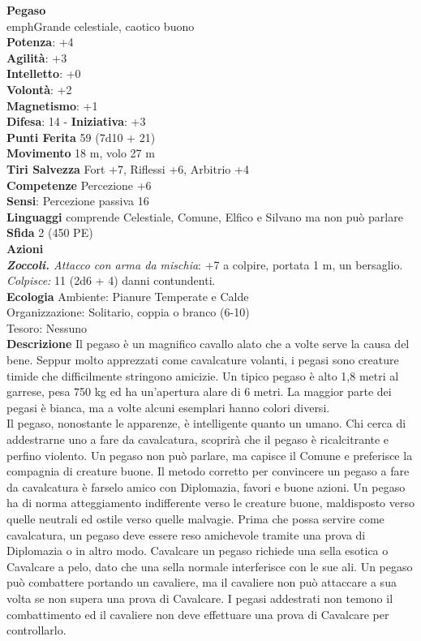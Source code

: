\begin{multicols}{2}
\medskip\textbf{Pegaso}\\
emph{Grande celestiale, caotico buono}\\
\textbf{Potenza}: +4\\
\textbf{Agilità}: +3\\
\textbf{Intelletto}: +0\\
\textbf{Volontà}: +2\\
\textbf{Magnetismo}: +1\\
\textbf{Difesa}: 14 - \textbf{Iniziativa}: +3\\
\textbf{Punti Ferita} 59 (7d10 + 21)\\
\textbf{Movimento} 18 m, volo 27 m\\
\textbf{Tiri Salvezza} Fort +7, Riflessi +6, Arbitrio +4\\
\textbf{Competenze} Percezione +6\\
\textbf{Sensi}: Percezione passiva 16\\
\textbf{Linguaggi} comprende Celestiale, Comune, Elfico e Silvano ma non può parlare\\
\textbf{Sfida} 2 (450 PE)\smallskip\\
\smallskip\textbf{Azioni}\\
\emph{\textbf{Zoccoli.} Attacco con arma da mischia}: +7 a colpire, portata 1 m, un bersaglio.\\
\emph{Colpisce:} 11 (2d6 + 4) danni contundenti.\\
\textbf{Ecologia}
Ambiente: Pianure Temperate e Calde\\
Organizzazione: Solitario, coppia o branco (6-10)\\
Tesoro: Nessuno\\
\textbf{Descrizione}
Il pegaso è un magnifico cavallo alato che a volte serve la causa del bene. Seppur molto apprezzati come cavalcature volanti, i pegasi sono creature timide che difficilmente stringono amicizie. Un tipico pegaso è alto 1,8 metri al garrese, pesa 750 kg ed ha un’apertura alare di 6 metri. La maggior parte dei pegasi è bianca, ma a volte alcuni esemplari hanno colori diversi.\\

Il pegaso, nonostante le apparenze, è intelligente quanto un umano. Chi cerca di addestrarne uno a fare da cavalcatura, scoprirà che il pegaso è ricalcitrante e perfino violento. Un pegaso non può parlare, ma capisce il Comune e preferisce la compagnia di creature buone. Il metodo corretto per convincere un pegaso a fare da cavalcatura è farselo amico con Diplomazia, favori e buone azioni. Un pegaso ha di norma atteggiamento indifferente verso le creature buone, maldisposto verso quelle neutrali ed ostile verso quelle malvagie. Prima che possa servire come cavalcatura, un pegaso deve essere reso amichevole tramite una prova di Diplomazia o in altro modo. Cavalcare un pegaso richiede una sella esotica o Cavalcare a pelo, dato che una sella normale interferisce con le sue ali. Un pegaso può combattere portando un cavaliere, ma il cavaliere non può attaccare a sua volta se non supera una prova di Cavalcare. I pegasi addestrati non temono il combattimento ed il cavaliere non deve effettuare una prova di Cavalcare per controllarlo.\\


\end{multicols}
